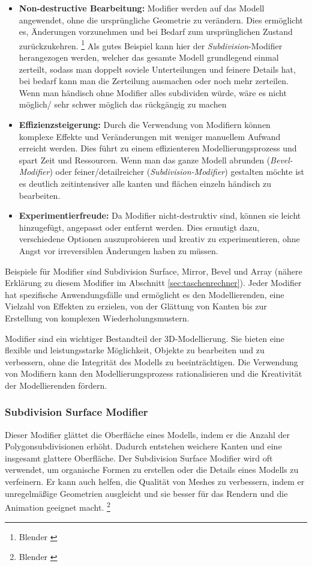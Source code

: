 \begin{itemize}
    \item \textbf{Non-destructive Bearbeitung:} Modifier werden auf das Modell angewendet, ohne die ursprüngliche Geometrie zu verändern. Dies ermöglicht es, Änderungen vorzunehmen und bei Bedarf zum ursprünglichen Zustand zurückzukehren. \footnote{Blender \cite {Non-Destructive Modifier}} Als gutes Beispiel kann hier der \textit{Subdivision}-Modifier herangezogen werden, welcher das gesamte Modell grundlegend einmal zerteilt, sodass man doppelt soviele Unterteilungen und feinere Details hat, bei bedarf kann man die Zerteilung ausmachen oder noch mehr zerteilen. Wenn man händisch ohne Modifier alles subdividen würde, wäre es nicht möglich/ sehr schwer möglich das rückgängig zu machen

    \item \textbf{Effizienzsteigerung:} Durch die Verwendung von Modifiern können komplexe Effekte und Veränderungen mit weniger manuellem Aufwand erreicht werden. Dies führt zu einem effizienteren Modellierungsprozess und spart Zeit und Ressourcen. Wenn man das ganze Modell abrunden (\textit{Bevel-Modifier}) oder feiner/detailreicher (\textit{Subdivision-Modifier}) gestalten möchte ist es deutlich zeitintensiver alle kanten und flächen einzeln händisch zu bearbeiten.

    \item \textbf{Experimentierfreude:} Da Modifier nicht-destruktiv sind, können sie leicht hinzugefügt, angepasst oder entfernt werden. Dies ermutigt dazu, verschiedene Optionen auszuprobieren und kreativ zu experimentieren, ohne Angst vor irreversiblen Änderungen haben zu müssen.
\end{itemize}

Beispiele für Modifier sind Subdivision Surface, Mirror, Bevel und Array (nähere Erklärung zu diesem Modifier im Abschnitt \ref{sec:taschenrechner}). Jeder Modifier hat spezifische Anwendungsfälle und ermöglicht es den Modellierenden, eine Vielzahl von Effekten zu erzielen, von der Glättung von Kanten bis zur Erstellung von komplexen Wiederholungsmustern.

Modifier sind ein wichtiger Bestandteil der 3D-Modellierung. Sie bieten eine flexible und leistungsstarke Möglichkeit, Objekte zu bearbeiten und zu verbessern, ohne die Integrität des Modells zu beeinträchtigen. Die Verwendung von Modifiern kann den Modellierungsprozess rationalisieren und die Kreativität der Modellierenden fördern.

\subsubsection*{Subdivision Surface Modifier}
Dieser Modifier glättet die Oberfläche eines Modells, indem er die Anzahl der Polygonsubdivisionen erhöht. Dadurch entstehen weichere Kanten und eine insgesamt glattere Oberfläche. Der Subdivision Surface Modifier wird oft verwendet, um organische Formen zu erstellen oder die Details eines Modells zu verfeinern. Er kann auch helfen, die Qualität von Meshes zu verbessern, indem er unregelmäßige Geometrien ausgleicht und sie besser für das Rendern und die Animation geeignet macht. \footnote{Blender \cite {Subdivision Surface Modifier}}


